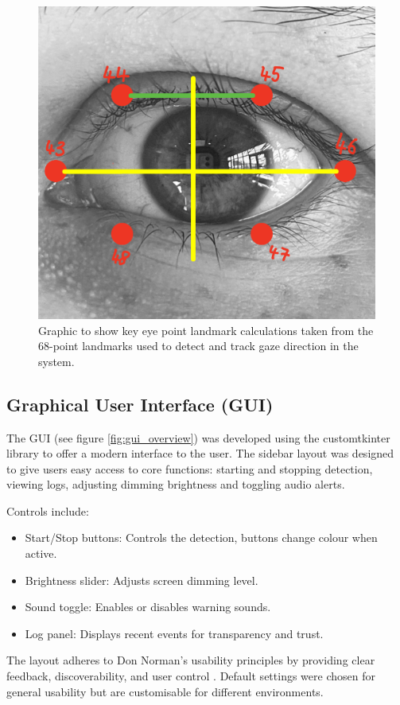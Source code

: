 \documentclass[12pt]{article}
\theoremstyle{plain}
\theoremstyle{definition}
\begin{document}
\begin{figure}
    \centering
    \includegraphics[width=0.6\linewidth]{img/Eye_calc.jpg}
    \caption{Graphic to show key eye point landmark calculations taken from the 68-point landmarks used to detect and track gaze direction in the system.}
    \label{fig:eye_calc}
\end{figure}

\subsection{Graphical User Interface (GUI)}
\label{gui}

The GUI (see figure \ref{fig:gui_overview}) was developed using the customtkinter library to offer a modern interface to the user. The sidebar layout was designed to give users easy access to core functions: starting and stopping detection, viewing logs, adjusting dimming brightness and toggling audio alerts.

Controls include:
\begin{itemize}
  \item Start/Stop buttons: Controls the detection, buttons change colour when active.
  \item Brightness slider: Adjusts screen dimming level.
  \item Sound toggle: Enables or disables warning sounds.
  \item Log panel: Displays recent events for transparency and trust.
\end{itemize}

The layout adheres to Don Norman’s usability principles by providing clear feedback, discoverability, and user control \cite{norman_design_1983}. Default settings were chosen for general usability but are customisable for different environments.
\end{document}
